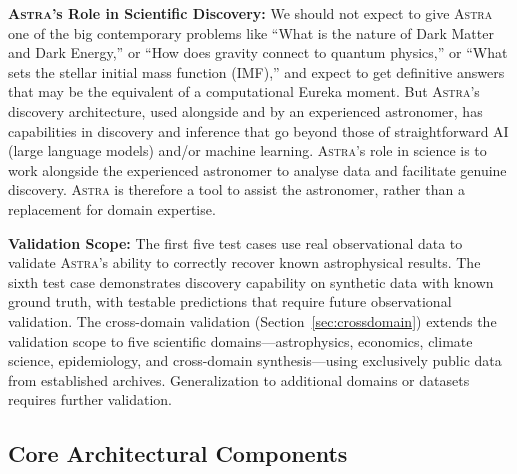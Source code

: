 \documentclass[usenatbib]{rasti}
\newcommand{\astra}{\textsc{Astra}\xspace}
\begin{document}
\textbf{\astra's Role in Scientific Discovery:}
We should not expect to give \astra one of the big contemporary problems like ``What is the nature of Dark Matter and Dark Energy,'' or ``How does gravity connect to quantum physics,'' or ``What sets the stellar initial mass function (IMF),'' and expect to get definitive answers that may be the equivalent of a computational Eureka moment.
But \astra's discovery architecture, used alongside and by an experienced astronomer, has capabilities in discovery and inference that go beyond those of straightforward AI (large language models) and/or machine learning.
\astra's role in science is to work alongside the experienced astronomer to analyse data and facilitate genuine discovery.
\astra is therefore a tool to assist the astronomer, rather than a replacement for domain expertise.

\textbf{Validation Scope:}
The first five test cases use real observational data to validate \astra's ability to correctly recover known astrophysical results.
The sixth test case demonstrates discovery capability on synthetic data with known ground truth, with testable predictions that require future observational validation.
The cross-domain validation (Section~\ref{sec:crossdomain}) extends the validation scope to five scientific domains---astrophysics, economics, climate science, epidemiology, and cross-domain synthesis---using exclusively public data from established archives.
Generalization to additional domains or datasets requires further validation.

\subsection{Core Architectural Components}
\label{sec:methods:components}
\end{document}
